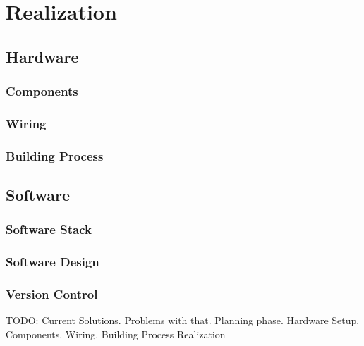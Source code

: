 \chapter{Realization}
\section{Hardware}
\subsection{Components}
\subsection{Wiring}
\subsection{Building Process}
\section{Software}
\subsection{Software Stack}
\subsection{Software Design}
\subsection{Version Control}

TODO: Current Solutions. Problems with that. Planning phase. Hardware Setup. Components. Wiring. Building Process
Realization